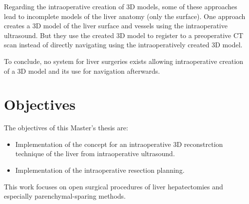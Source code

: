 Regarding the intraoperative creation of 3D models, some of these approaches lead to
incomplete models of the liver anatomy (only the surface). One approach creates
a 3D model of the liver surface and vessels using the intraoperative ultrasound.
But they use the created 3D model to register to a preoperative CT scan instead
of directly navigating using the intraoperatively created 3D model.

To conclude, no system for liver surgeries exists allowing intraoperative creation of a 3D model and
its use for navigation afterwards.


\section{Objectives} 
The objectives of this Master's thesis are:
\begin{itemize}
  \item Implementation of the concept for an intraoperative 3D reconstrction
  technique of the liver from intraoperative ultrasound. 
  \item Implementation of the intraoperative resection planning.
\end{itemize}
This work focuses on open surgical procedures of liver hepatectomies and
especially parenchymal-sparing methods.








